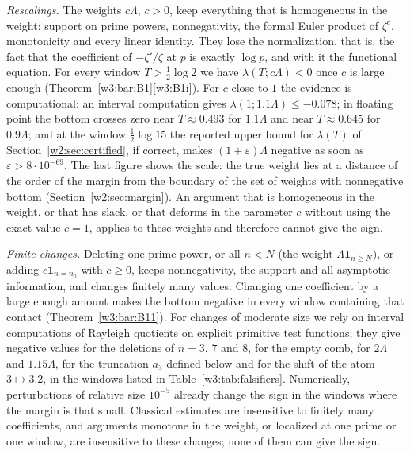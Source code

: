 \documentclass[11pt]{amsart}
\theoremstyle{definition}
\theoremstyle{remark}
\numberwithin{equation}{section}
\newcommand{\lam}{\lambda(T)}                          %
\begin{document}
\emph{Rescalings.} The weights $c\Lambda$, $c>0$, keep everything that is homogeneous in the weight: support on
prime powers, nonnegativity, the formal Euler product of $\zeta^c$, monotonicity and every linear identity. They lose
the normalization, that is, the fact that the coefficient of $-\zeta'/\zeta$ at $p$ is exactly $\log p$, and with it
the functional equation. For every window $T>\frac12\log2$ we have $\lambda(T;c\Lambda)<0$ once $c$ is large enough
(Theorem~\ref{w3:bar:B1}\ref{w3:B1i}). For $c$ close to $1$ the evidence is computational: an interval computation
gives $\lambda(1;1.1\Lambda)\le-0.078$; in floating point the bottom crosses zero near $T\approx0.493$ for
$1.1\Lambda$ and near $T\approx0.645$ for $0.9\Lambda$; and at the window $\frac12\log15$ the reported upper bound
for $\lam$ of Section~\ref{w2:sec:certified}, if correct, makes $(1+\varepsilon)\Lambda$ negative as soon as
$\varepsilon>8\cdot10^{-69}$. The last figure shows the scale: the true weight lies at a distance of the order of the
margin from the boundary of the set of weights with nonnegative bottom (Section~\ref{w2:sec:margin}). An argument
that is homogeneous in the weight, or that has slack, or that deforms in the parameter $c$ without using the exact
value $c=1$, applies to these weights and therefore cannot give the sign.

\emph{Finite changes.} Deleting one prime power, or all $n<N$ (the weight $\Lambda\mathbf 1_{n\ge N}$), or adding
$c\mathbf 1_{n=n_0}$ with $c\ge0$, keeps nonnegativity, the support and all asymptotic information, and changes
finitely many values. Changing one coefficient by a large enough amount makes the bottom negative in every window
containing that contact (Theorem~\ref{w3:bar:B11}). For changes of moderate size we rely on interval computations of
Rayleigh quotients on explicit primitive test functions; they give negative values for the deletions of $n=3$, $7$
and $8$, for the empty comb, for $2\Lambda$ and $1.15\Lambda$, for the truncation $a_3$ defined below and for
the shift of the atom $3\mapsto3.2$, in the windows listed in Table~\ref{w3:tab:falsifiers}. Numerically, perturbations of relative size $10^{-5}$ already change the sign in
the windows where the margin is that small. Classical estimates are insensitive to finitely many coefficients, and
arguments monotone in the weight, or localized at one prime or one window, are insensitive to these changes; none of
them can give the sign.
\end{document}

